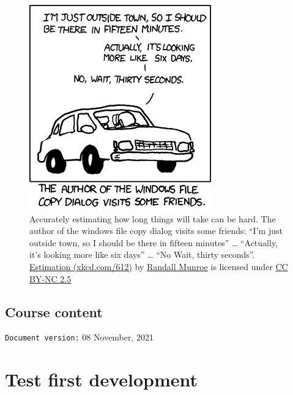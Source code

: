 \documentclass[
]{book}
\begin{document}
\begin{figure}

{\centering \includegraphics[width=0.75\linewidth]{images/xkcd-estimation} 

}

\caption{Accurately estimating how long things will take can be hard. The author of the windows file copy dialog visits some friends: ``I'm just outside town, so I should be there in fifteen minutes'' \ldots{} ``Actually, it's looking more like six days'' \ldots{} ``No Wait, thirty seconds''. \href{https://xkcd.com/612/}{Estimation (xkcd.com/612)} by \href{https://en.wikipedia.org/wiki/Randall_Munroe}{Randall Munroe} is licensed under \href{https://creativecommons.org/licenses/by-nc/2.5/}{CC BY-NC 2.5}}\label{fig:xkcd-estimation-fig}
\end{figure}



\hypertarget{course-content}{%
\section{Course content}\label{course-content}}

\texttt{Document\ version:} 08 November, 2021

\hypertarget{testing}{%
\chapter{Test first development}\label{testing}}
\end{document}
